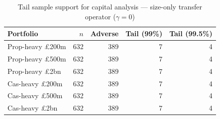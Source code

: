 \begin{table}[htbp]
\centering
\caption{Tail sample support for capital analysis --- size-only transfer operator ($\gamma=0$)}
\label{tab:tail_sample_support}
\begin{tabular}{lrrrr}
\toprule
\textbf{Portfolio} & \textbf{$n$} & \textbf{Adverse} & \textbf{Tail (99\%)} & \textbf{Tail (99.5\%)} \\
\midrule
Prop-heavy £200m & 632 & 389 & 7 & 4 \\
Prop-heavy £500m & 632 & 389 & 7 & 4 \\
Prop-heavy £2bn & 632 & 389 & 7 & 4 \\
Cas-heavy £200m & 632 & 389 & 7 & 4 \\
Cas-heavy £500m & 632 & 389 & 7 & 4 \\
Cas-heavy £2bn & 632 & 389 & 7 & 4 \\
\bottomrule
\end{tabular}
\end{table}
